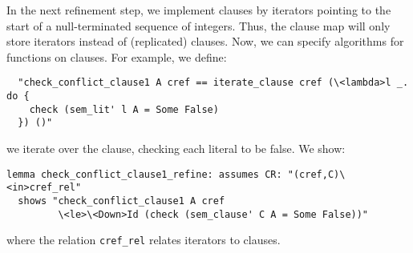 \documentclass[smallcondensed]{svjour3}     %
\newcommand{\isai}{\lstinline[language=isabelle,basicstyle=\normalsize\ttfamily\slshape]}
\begin{document}
In the next refinement step, we implement clauses by iterators pointing to the start of a null-terminated sequence of integers.
Thus, the clause map will only store iterators instead of (replicated) clauses. 
Now, we can specify algorithms for functions on clauses. For example, we define:
\begin{lstlisting}
  "check_conflict_clause1 A cref == iterate_clause cref (\<lambda>l _. do {
    check (sem_lit' l A = Some False)
  }) ()"
\end{lstlisting}
\ie we iterate over the clause, checking each literal to be false. We show:
\begin{lstlisting}
lemma check_conflict_clause1_refine: assumes CR: "(cref,C)\<in>cref_rel"
  shows "check_conflict_clause1 A cref 
         \<le>\<Down>Id (check (sem_clause' C A = Some False))"
\end{lstlisting}
where the relation \isai{cref_rel} relates iterators to clauses.
\end{document}
